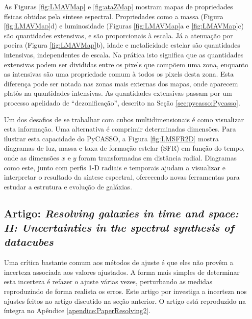 As Figuras \ref{fig:LMAVMap} e \ref{fig:ataZMap} mostram mapas de propriedades
físicas obtidas pela síntese espectral. Propriedades como a massa (Figura
\ref{fig:LMAVMap}d) e luminosidade (Figuras \ref{fig:LMAVMap}a e
\ref{fig:LMAVMap}c) são quantidades extensivas, e são proporcionais à escala. Já
a atenuação por poeira (Figura \ref{fig:LMAVMap}b), idade e metalicidade estelar
são quantidades intensivas, independentes de escala. Na prática isto significa
que as quantidades extensivas podem ser divididas entre os pixels que compõem
uma zona, enquanto as intensivas são uma propriedade comum à todos os pixels
desta zona. Esta diferença pode ser notada nas zonas mais externas dos mapas,
onde aparecem platôs na quantidades intensivas. As quantidades extensivas passam
por um processo apelidado de ``dezonificação''\fixme, descrito na Seção
\ref{sec:pycasso:Pycasso}.

Um dos desafios de se trabalhar com cubos multidimensionais é como visualizar
esta informação. Uma alternativa é comprimir determinadas dimensões. Para
ilustrar esta capacidade do PyCASSO, a Figura \ref{fig:LMSFR2D} mostra diagramas
de luz, massa e taxa de formação estelar (SFR) em função do tempo, onde as
dimensões $x$ e $y$ foram transformadas em distância radial. Diagramas como
este, junto com perfis 1-D radiais e temporais ajudam a visualizar e interpretar
o resultado da síntese espectral, oferecendo novas ferramentas para estudar a
estrutura e evolução de galáxias.



\subsection{Artigo: {\em Resolving galaxies in time and space: II: Uncertainties
in the spectral synthesis of datacubes}}
\label{sec:pycasso:art:Resolving2}

Uma crítica bastante comum aos métodos de ajuste é que eles não provêm a
incerteza associada aos valores ajustados. A forma mais simples de determinar
esta incerteza é refazer o ajuste várias vezes, perturbando as medidas
reproduzindo de forma realista os erros. Este artigo por
\citet{CidFernandes2014} investiga a incerteza nos ajustes feitos no artigo
discutido na seção anterior. O artigo está reproduzido na íntegra no Apêndice
\ref{apendice:PaperResolving2}.

